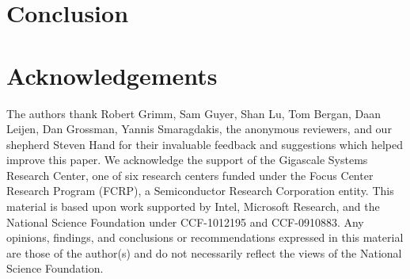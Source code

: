\documentclass{acm_proc_onecol}
\newcommand{\punt}[1]{}
\begin{document}
\punt{
\section{Future Work}

}

\section{Conclusion}


\section{Acknowledgements}
The authors thank Robert Grimm, Sam Guyer, Shan Lu, Tom Bergan, Daan
Leijen, Dan Grossman, Yannis Smaragdakis, the anonymous reviewers, and our
shepherd Steven Hand for their invaluable feedback and suggestions which helped
improve this paper. We acknowledge the support of the Gigascale
Systems Research Center, one of six research centers funded under the
Focus Center Research Program (FCRP), a Semiconductor Research
Corporation entity.  This material is based upon work supported by
Intel, Microsoft Research, and the National Science Foundation under
CCF-1012195 and CCF-0910883. Any opinions, findings, and conclusions
or recommendations expressed in this material are those of the
author(s) and do not necessarily reflect the views of the National
Science Foundation.

{


}
\end{document}
